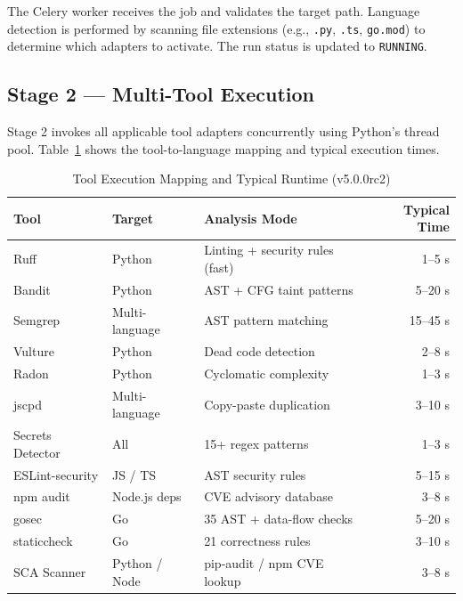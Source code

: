 The Celery worker receives the job and validates the target path. Language detection is performed by scanning file extensions (e.g., \texttt{.py}, \texttt{.ts}, \texttt{go.mod}) to determine which adapters to activate. The run status is updated to \texttt{RUNNING}.

\subsection{Stage 2 — Multi-Tool Execution}

Stage 2 invokes all applicable tool adapters concurrently using Python's thread pool. Table~\ref{tab:tool_execution} shows the tool-to-language mapping and typical execution times.

\begin{table}[H]
\caption{Tool Execution Mapping and Typical Runtime (v5.0.0rc2)}
\label{tab:tool_execution}
\centering
\renewcommand{\arraystretch}{1.3}
\begin{tabularx}{\textwidth}{@{} l l X r @{}}
\toprule
\textbf{Tool} & \textbf{Target} & \textbf{Analysis Mode} & \textbf{Typical Time} \\
\midrule
Ruff             & Python          & Linting + security rules (fast)    & 1--5 s   \\
Bandit           & Python          & AST + CFG taint patterns           & 5--20 s  \\
Semgrep          & Multi-language  & AST pattern matching               & 15--45 s \\
Vulture          & Python          & Dead code detection                & 2--8 s   \\
Radon            & Python          & Cyclomatic complexity              & 1--3 s   \\
jscpd            & Multi-language  & Copy-paste duplication             & 3--10 s  \\
Secrets Detector & All             & 15+ regex patterns                 & 1--3 s   \\
ESLint-security  & JS / TS         & AST security rules                 & 5--15 s  \\
npm audit        & Node.js deps    & CVE advisory database              & 3--8 s   \\
gosec            & Go              & 35 AST + data-flow checks          & 5--20 s  \\
staticcheck      & Go              & 21 correctness rules               & 3--10 s  \\
SCA Scanner      & Python / Node   & pip-audit / npm CVE lookup         & 3--8 s   \\
\bottomrule
\end{tabularx}
\end{table}

